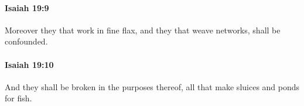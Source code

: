		\paragraph{Isaiah 19:9} %
			\label{ISAIAH-19-9}

			Moreover they that work in fine flax, and they that weave networks, shall be confounded.


		\paragraph{Isaiah 19:10} %
			\label{ISAIAH-19-10}

			And they shall be broken in the purposes thereof, all that make sluices and ponds for fish.


